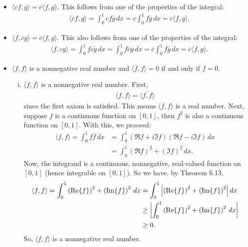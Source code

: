 \documentclass[11pt]{article}
\begin{document}
\begin{enumerate}[(a)]
\begin{itemize}
		
		\item $\boxed{\langle cf,g\rangle = c\langle f,g\rangle}$. This follows from one of the properties of the integral:
		\begin{align*}
		\langle cf, g\rangle = \int^1_0 cf\overline{g}\,dx = c\int^1_0 f\overline{g}\,dx= c\langle f,g\rangle.
		\end{align*}
		
		\item $\boxed{\langle f,cg\rangle = \overline{c}\langle f,g\rangle}$. This also follows from one of the properties of the integral:
		\begin{align*}
		\langle f, cg\rangle = \int^1_0 f\overline{cg}\,dx = \int^1_0 f\overline{c}\overline{g}\,dx = \overline{c}\int^1_0 f\overline{g}\,dx = \overline{c}\langle f,g\rangle.
		\end{align*}
		
		\item $\langle f,f\rangle$ is a nonnegative real number and $\langle f,f \rangle = 0$ if and only if $f=0$.
		\begin{enumerate}[(i)]
			\item $\langle f,f\rangle$ is a nonnegative real number. First,
			\begin{align*}
			\langle f,f\rangle = \overline{\langle f,f\rangle}
			\end{align*}
			since the first axiom is satisfied. This means $\langle f,f\rangle$ is a real number. Next, suppose $f$ is a continuous function on $[0,1]$, then $f^2$ is also a continuous function on $[0,1]$. With this, we proceed:
			\begin{align*}
			\langle f,f\rangle =  \int^1_0  f\overline{f}\,dx &= \int^1_0 \left(\Re{f} + i\Im{f}\right)\left(\Re{f} - i\Im{f}\right) \,dx\\
			&= \int^1_0 \left(\Re{f}\right)^2 + \left(\Im{f}\right)^2\,dx.
			\end{align*}
			Now, the integrand is a continuous, nonnegative, real-valued function on $[0,1]$ (hence integrable on $[0,1]$). So we have, by Theorem 6.13, 
			\begin{align*}
			\langle f,f\rangle 
			= \int^1_0 \left(\Re{f}\right)^2 + \left(\Im{f}\right)^2\,dx&= \int^1_0 \abs{\left(\Re{f}\right)^2 + \left(\Im{f}\right)^2}\,dx \\
			&\geq \abs{\int^1_0 \left(\Re{f}\right)^2 + \left(\Im{f}\right)^2\,dx} \\
			&\geq 0.
			\end{align*} 
			So, $\langle f,f\rangle$ is a nonnegative real number. 
			

\end{enumerate}
\end{itemize}
\end{enumerate}
\end{document}
